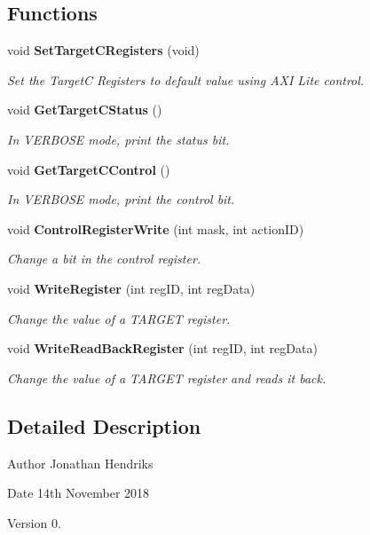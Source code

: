 \subsection*{Functions}
\begin{DoxyCompactItemize}
\item 
void \textbf{ Set\+Target\+C\+Registers} (void)
\begin{DoxyCompactList}\small\item\em Set the TargetC Registers to default value using A\+XI Lite control. \end{DoxyCompactList}\item 
void \textbf{ Get\+Target\+C\+Status} ()
\begin{DoxyCompactList}\small\item\em In V\+E\+R\+B\+O\+SE mode, print the status bit. \end{DoxyCompactList}\item 
void \textbf{ Get\+Target\+C\+Control} ()
\begin{DoxyCompactList}\small\item\em In V\+E\+R\+B\+O\+SE mode, print the control bit. \end{DoxyCompactList}\item 
void \textbf{ Control\+Register\+Write} (int mask, int action\+ID)
\begin{DoxyCompactList}\small\item\em Change a bit in the control register. \end{DoxyCompactList}\item 
void \textbf{ Write\+Register} (int reg\+ID, int reg\+Data)
\begin{DoxyCompactList}\small\item\em Change the value of a T\+A\+R\+G\+ET register. \end{DoxyCompactList}\item 
void \textbf{ Write\+Read\+Back\+Register} (int reg\+ID, int reg\+Data)
\begin{DoxyCompactList}\small\item\em Change the value of a T\+A\+R\+G\+ET register and reads it back. \end{DoxyCompactList}\end{DoxyCompactItemize}


\subsection{Detailed Description}
\begin{DoxyAuthor}{Author}
Jonathan Hendriks 
\end{DoxyAuthor}
\begin{DoxyDate}{Date}
14th November 2018 
\end{DoxyDate}
\begin{DoxyVersion}{Version}
0. 
\end{DoxyVersion}


